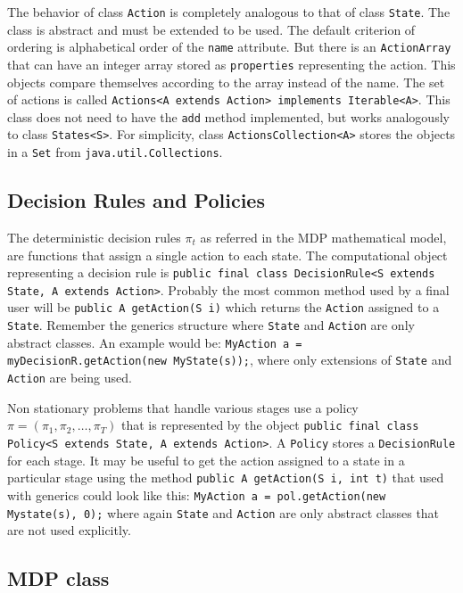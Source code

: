 \documentclass[11pt]{article}
\begin{document}
The behavior of class \lstinline!Action! is completely analogous to that of class \lstinline!State!. The class is abstract and must be extended to be used. The default criterion of ordering is alphabetical order of the \lstinline!name! attribute. But there is an \lstinline!ActionArray! that can have an integer array stored as \lstinline!properties! representing the action. This objects compare themselves according to the array instead of the name. The set of actions is called \lstinline!Actions<A extends Action> implements Iterable<A>!. This class does not need to have the \lstinline!add! method implemented, but works analogously to class \lstinline!States<S>!. For simplicity, class \lstinline!ActionsCollection<A>! stores the objects in a \lstinline!Set! from \lstinline!java.util.Collections!.

\subsection{Decision Rules and Policies}

The deterministic decision rules $\pi_t$ as referred in the MDP mathematical model, are functions that assign a single action to each state. The computational object representing a decision rule is \lstinline!public final class DecisionRule<S extends State, A extends Action>!. Probably the most common method used by a final user will be \lstinline!public A getAction(S i)! which returns the \lstinline!Action! assigned to a \lstinline!State!. Remember the generics structure where \lstinline!State! and \lstinline!Action! are only abstract classes. An example would be: \lstinline!MyAction a = myDecisionR.getAction(new MyState(s));!, where only extensions of \lstinline!State! and \lstinline!Action! are being used.

Non stationary problems that handle various stages use a policy $\pi=(\pi_1, \pi_2,\ldots,\pi_T)$ that is represented by the object \lstinline!public final class Policy<S extends State, A extends Action>!. A \lstinline!Policy! stores a \lstinline!DecisionRule! for each stage. It may be useful to get the action assigned to a state in a particular stage using the method \lstinline!public A getAction(S i, int t)! that used with generics could look like this: \lstinline!MyAction a = pol.getAction(new Mystate(s), 0);! where again \lstinline!State! and \lstinline!Action! are only abstract classes that are not used explicitly.

\subsection{MDP class}
\end{document}
